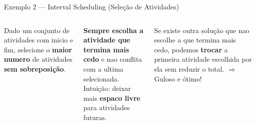 \documentclass[aspectratio=169,10pt]{beamer}
\begin{document}
\begin{frame}{Exemplo 2 --- Interval Scheduling (Seleção de Atividades)}
  \begin{columns}[c]
      \begin{tcolorbox}[caixaAzul,title={Problema}]
        \small
        Dado um conjunto de atividades com inicio
        e fim, selecione o \textbf{maior numero}
        de atividades \textbf{sem sobreposição}.
      \end{tcolorbox}
      \vspace{0.1cm}
      \begin{tcolorbox}[caixaDourada,title={Estrategia Gulosa}]
        \footnotesize
        \textbf{Sempre escolha a atividade que
        termina mais cedo} e nao conflita com
        a ultima selecionada.\\[4pt]
        Intuição: deixar mais \textbf{espaco livre}
        para atividades futuras.
      \end{tcolorbox}
      \vspace{0.1cm}
      \begin{tcolorbox}[caixaVerde,title={Exchange Argument}]
        \footnotesize
        Se existe outra solução que nao escolhe
        a que termina mais cedo, podemos \textbf{trocar}
        a primeira atividade escolhida por ela
        sem reduzir o total. $\Rightarrow$ Guloso e ótimo!
      \end{tcolorbox}
      \centering
\end{columns}
\end{frame}
\end{document}
